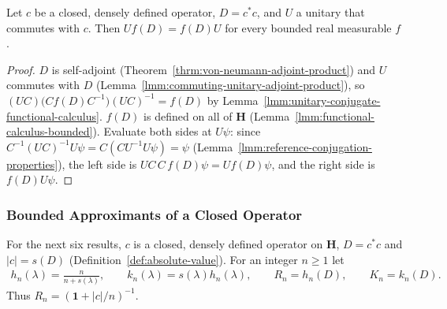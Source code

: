 \begin{lemma}
    \label{lmm:commuting-unitary-bounded-function}
    \leanok
    Let $c$ be a closed, densely defined operator, $D = c^*c$, and $U$ a unitary that commutes with $c$. Then $Uf(D) = f(D)U$ for every bounded real measurable $f$.
\end{lemma}
\begin{proof}
    \leanok
    $D$ is self-adjoint (Theorem~\ref{thrm:von-neumann-adjoint-product}) and $U$ commutes with $D$ (Lemma~\ref{lmm:commuting-unitary-adjoint-product}), so $(UC)\big(Cf(D)C^{-1}\big)(UC)^{-1} = f(D)$ by Lemma~\ref{lmm:unitary-conjugate-functional-calculus}. $f(D)$ is defined on all of $\mathbf{H}$ (Lemma~\ref{lmm:functional-calculus-bounded}). Evaluate both sides at $U\psi$: since $C^{-1}(UC)^{-1}U\psi = C(CU^{-1}U\psi) = \psi$ (Lemma~\ref{lmm:reference-conjugation-properties}), the left side is $UC\,C\,f(D)\psi = Uf(D)\psi$, and the right side is $f(D)U\psi$.
\end{proof}

\subsubsection{Bounded Approximants of a Closed Operator}

For the next six results, $c$ is a closed, densely defined operator on $\mathbf{H}$, $D = c^*c$ and $|c| = s(D)$ (Definition~\ref{def:absolute-value}). For an integer $n \ge 1$ let
\begin{align}
    h_n(\lambda) = \frac{n}{n + s(\lambda)}, \qquad k_n(\lambda) = s(\lambda)h_n(\lambda), \qquad R_n = h_n(D), \qquad K_n = k_n(D).
\end{align}
Thus $R_n = (\mathbf{1} + |c|/n)^{-1}$.

